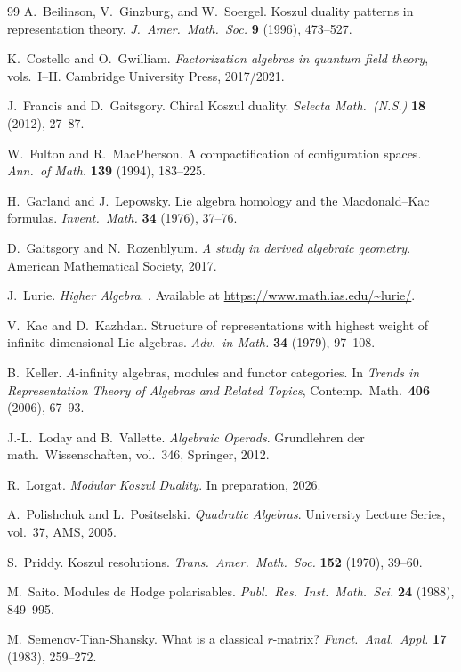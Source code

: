 \documentclass[11pt,reqno]{amsart}
\theoremstyle{definition}
\theoremstyle{remark}
\numberwithin{equation}{section}
\begin{document}
\begin{thebibliography}{99}
A.~Beilinson, V.~Ginzburg, and W.~Soergel.
\newblock Koszul duality patterns in representation theory.
\newblock \emph{J.~Amer.~Math.~Soc.} \textbf{9} (1996), 473--527.

K.~Costello and O.~Gwilliam.
\newblock \emph{Factorization algebras in quantum field theory},
 vols.~I--II.
\newblock Cambridge University Press, 2017/2021.

J.~Francis and D.~Gaitsgory.
\newblock Chiral Koszul duality.
\newblock \emph{Selecta Math.~(N.S.)} \textbf{18} (2012), 27--87.

W.~Fulton and R.~MacPherson.
\newblock A compactification of configuration spaces.
\newblock \emph{Ann.~of Math.} \textbf{139} (1994), 183--225.

H.~Garland and J.~Lepowsky.
\newblock Lie algebra homology and the Macdonald--Kac formulas.
\newblock \emph{Invent.~Math.} \textbf{34} (1976), 37--76.

D.~Gaitsgory and N.~Rozenblyum.
\newblock \emph{A study in derived algebraic geometry}.
\newblock American Mathematical Society, 2017.

J.~Lurie.
\newblock \emph{Higher Algebra}.
. Available at
 \url{https://www.math.ias.edu/~lurie/}.

V.~Kac and D.~Kazhdan.
\newblock Structure of representations with highest weight of
 infinite-dimensional Lie algebras.
\newblock \emph{Adv.~in Math.} \textbf{34} (1979), 97--108.

B.~Keller.
\newblock $A$-infinity algebras, modules and functor categories.
\newblock In \emph{Trends in Representation Theory of Algebras
 and Related Topics}, Contemp.~Math.~\textbf{406} (2006), 67--93.

J.-L.~Loday and B.~Vallette.
\newblock \emph{Algebraic Operads}.
\newblock Grundlehren der math.~Wissenschaften, vol.~346,
 Springer, 2012.

R.~Lorgat.
\newblock \emph{Modular Koszul Duality}.
\newblock In preparation, 2026.

A.~Polishchuk and L.~Positselski.
\newblock \emph{Quadratic Algebras}.
\newblock University Lecture Series, vol.~37, AMS, 2005.

S.~Priddy.
\newblock Koszul resolutions.
\newblock \emph{Trans.~Amer.~Math.~Soc.} \textbf{152} (1970), 39--60.

M.~Saito.
\newblock Modules de Hodge polarisables.
\newblock \emph{Publ.~Res.~Inst.~Math.~Sci.} \textbf{24} (1988), 849--995.

M.~Semenov-Tian-Shansky.
\newblock What is a classical $r$-matrix?
\newblock \emph{Funct.~Anal.~Appl.} \textbf{17} (1983), 259--272.

\end{thebibliography}
\end{document}

